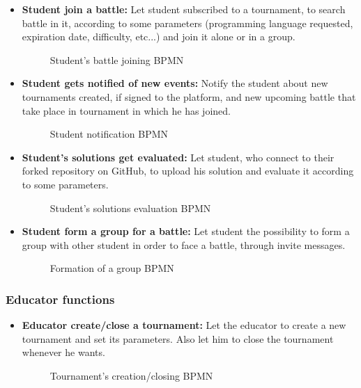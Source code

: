 \documentclass{article}
\begin{document}
{\begin{itemize}
            \item \textbf{Student join a battle:} Let student subscribed to a tournament, to search battle in it, according to some parameters (programming language requested, expiration date, difficulty, etc...) and join it alone or in a group.
            \begin{figure}[H]
                \centering
                \caption{Student's battle joining BPMN}
                \label{fig:enter-label}
            \end{figure}

            \item \textbf{Student gets notified of new events:} Notify the student about new tournaments created, if signed to the platform, and new upcoming battle that take place in tournament in which he has joined.
            \begin{figure}[H]
                \centering
                \caption{Student notification BPMN}
                \label{fig:enter-label}
            \end{figure}
            
            \item \textbf{Student's solutions get evaluated:} Let student, who connect to their forked repository on GitHub, to upload his solution and evaluate it according to some parameters.
            \begin{figure}[H]
                \centering
                \caption{Student's solutions evaluation BPMN}
                \label{fig:enter-label}
            \end{figure}

            \item \textbf{Student form a group for a battle:} Let student the possibility to form a group with other student in order to face a battle, through invite messages.
            \begin{figure}[H]
                \centering
                \caption{Formation of a group BPMN}
                \label{fig:enter-label}
            \end{figure}
        \end{itemize}

    \subsubsection{Educator functions}
        \begin{itemize}
            \item \textbf{Educator create/close a tournament:} Let the educator to create a new tournament and set its parameters. Also let him to close the tournament whenever he wants.
            \begin{figure}[H]
                \centering
                \caption{Tournament's creation/closing BPMN}
                \label{fig:enter-label}
            \end{figure}


\end{itemize}}
\end{document}
